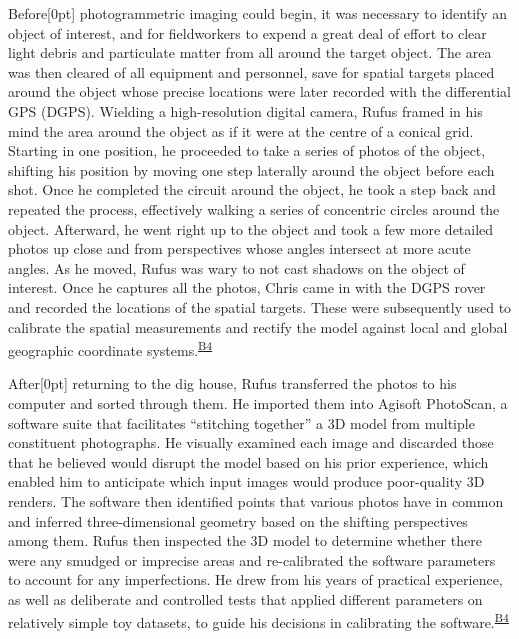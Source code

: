 \documentclass[
]{article}
\newcommand{\paragraphnumber}[1]{\marginnote{\color{lightgray}\tiny{#1}}[0pt]}
\begin{document}
Before\paragraphnumber{[64]} photogrammetric imaging could begin, it was
necessary to identify an object of interest, and for fieldworkers to
expend a great deal of effort to clear light debris and particulate
matter from all around the target object. The area was then cleared of
all equipment and personnel, save for spatial targets placed around the
object whose precise locations were later recorded with the differential
GPS (DGPS). Wielding a high-resolution digital camera, Rufus framed in
his mind the area around the object as if it were at the centre of a
conical grid. Starting in one position, he proceeded to take a series of
photos of the object, shifting his position by moving one step laterally
around the object before each shot. Once he completed the circuit around
the object, he took a step back and repeated the process, effectively
walking a series of concentric circles around the object. Afterward, he
went right up to the object and took a few more detailed photos up close
and from perspectives whose angles intersect at more acute angles. As he
moved, Rufus was wary to not cast shadows on the object of interest.
Once he captures all the photos, Chris came in with the DGPS rover and
recorded the locations of the spatial targets. These were subsequently
used to calibrate the spatial measurements and rectify the model against
local and global geographic coordinate
systems.\textsuperscript{\hyperref[sec-B4]{B4}}

After\paragraphnumber{[65]} returning to the dig house, Rufus
transferred the photos to his computer and sorted through them. He
imported them into Agisoft PhotoScan, a software suite that facilitates
``stitching together'' a 3D model from multiple constituent photographs.
He visually examined each image and discarded those that he believed
would disrupt the model based on his prior experience, which enabled him
to anticipate which input images would produce poor-quality 3D renders.
The software then identified points that various photos have in common
and inferred three-dimensional geometry based on the shifting
perspectives among them. Rufus then inspected the 3D model to determine
whether there were any smudged or imprecise areas and re-calibrated the
software parameters to account for any imperfections. He drew from his
years of practical experience, as well as deliberate and controlled
tests that applied different parameters on relatively simple toy
datasets, to guide his decisions in calibrating the
software.\textsuperscript{\hyperref[sec-B4]{B4}}
\end{document}
